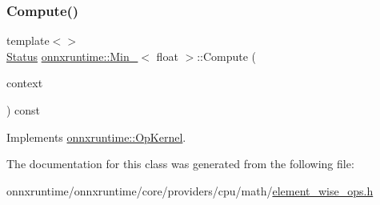 \subsubsection{\texorpdfstring{Compute()}{Compute()}\hspace{0.1cm}{\footnotesize\ttfamily [2/2]}}
{\footnotesize\ttfamily template$<$$>$ \\
\mbox{\hyperlink{classonnxruntime_1_1common_1_1Status}{Status}} \mbox{\hyperlink{classonnxruntime_1_1Min__8}{onnxruntime\+::\+Min\+\_}}$<$ float $>$\+::Compute (\begin{DoxyParamCaption}\item[{\mbox{\hyperlink{classonnxruntime_1_1OpKernelContext}{Op\+Kernel\+Context}} $\ast$}]{context }\end{DoxyParamCaption}) const\hspace{0.3cm}{\ttfamily [virtual]}}



Implements \mbox{\hyperlink{classonnxruntime_1_1OpKernel_a9eca8656a78b1b3ab9d3351a12798650}{onnxruntime\+::\+Op\+Kernel}}.



The documentation for this class was generated from the following file\+:\begin{DoxyCompactItemize}
\item 
onnxruntime/onnxruntime/core/providers/cpu/math/\mbox{\hyperlink{element__wise__ops_8h}{element\+\_\+wise\+\_\+ops.\+h}}\end{DoxyCompactItemize}
